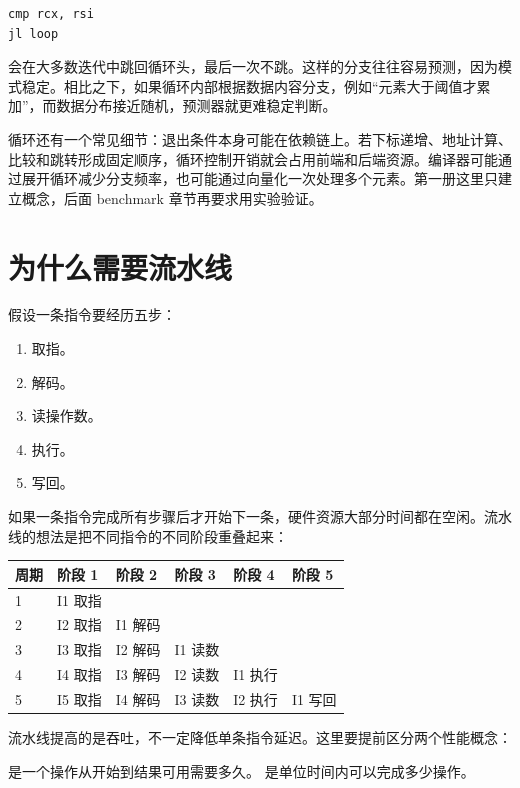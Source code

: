 \begin{lstlisting}
cmp rcx, rsi
jl loop
\end{lstlisting}

会在大多数迭代中跳回循环头，最后一次不跳。这样的分支往往容易预测，因为模式稳定。相比之下，如果循环内部根据数据内容分支，例如“元素大于阈值才累加”，而数据分布接近随机，预测器就更难稳定判断。

循环还有一个常见细节：退出条件本身可能在依赖链上。若下标递增、地址计算、比较和跳转形成固定顺序，循环控制开销就会占用前端和后端资源。编译器可能通过展开循环减少分支频率，也可能通过向量化一次处理多个元素。第一册这里只建立概念，后面 benchmark 章节再要求用实验验证。

\section{为什么需要流水线}

假设一条指令要经历五步：

\begin{enumerate}
  \item 取指。
  \item 解码。
  \item 读操作数。
  \item 执行。
  \item 写回。
\end{enumerate}

如果一条指令完成所有步骤后才开始下一条，硬件资源大部分时间都在空闲。流水线的想法是把不同指令的不同阶段重叠起来：

\begin{center}
\begin{tabular}{llllll}
\toprule
周期 & 阶段 1 & 阶段 2 & 阶段 3 & 阶段 4 & 阶段 5 \\
\midrule
1 & I1 取指 & & & & \\
2 & I2 取指 & I1 解码 & & & \\
3 & I3 取指 & I2 解码 & I1 读数 & & \\
4 & I4 取指 & I3 解码 & I2 读数 & I1 执行 & \\
5 & I5 取指 & I4 解码 & I3 读数 & I2 执行 & I1 写回 \\
\bottomrule
\end{tabular}
\end{center}

流水线提高的是吞吐，不一定降低单条指令延迟。这里要提前区分两个性能概念：

 是一个操作从开始到结果可用需要多久。  是单位时间内可以完成多少操作。

